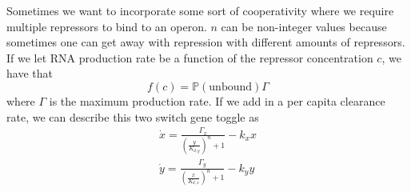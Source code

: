 \documentclass{article}
\newcommand{\p}{\mathbb{P}}
\theoremstyle{definition}
\begin{document}
Sometimes we want to incorporate some sort of cooperativity where we require multiple repressors to bind to an operon. $n$ can be non-integer values because sometimes one can get away with repression with different amounts of repressors. If we let RNA production rate be a function of the repressor concentration $c$, we have that 
\begin{equation*}
    f(c)=\p (\text{unbound})\Gamma
\end{equation*}
where $\Gamma$ is the maximum production rate. If we add in a per capita clearance rate, we can describe this two switch gene toggle as 
\begin{equation*}
    \begin{split}
        \dot x = \frac{\Gamma_x}{\left(\frac{y}{K_{d,y}}\right)^n+1}-k_xx \\
        \dot y =\frac{\Gamma_y}{\left(\frac{x}{K_{d,x}}\right)^n+1}-k_yy 
    \end{split}
\end{equation*} 
\end{document}
